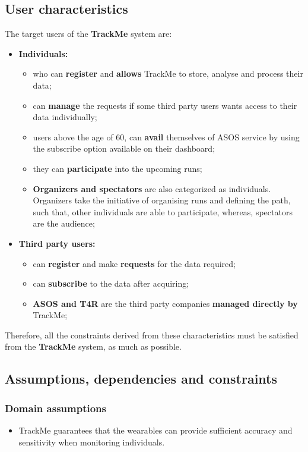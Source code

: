 \documentclass[12pt]{article}
\newcommand\assumption[1]{\item[{[D#1]}] }
\begin{document}
\subsection{User characteristics}
The target users of the \textbf{TrackMe} system are:
\begin{itemize}
\item{} \textbf{Individuals:} 
\begin{itemize}
\item{} who can \textbf{register} and \textbf{allows} TrackMe to store, analyse and process their data;
\item{} can \textbf{manage} the requests if some third party users wants access to their data individually;
\item{} users above the age of 60, can \textbf{avail} themselves of ASOS service by using the subscribe option available on their dashboard;
\item{} they can \textbf{participate} into the upcoming runs;
\item{} \textbf{Organizers and spectators} are also categorized as individuals. Organizers take the initiative of organising runs and defining the path, such that, other individuals are able to participate, whereas, spectators are the audience;

\end{itemize}
\item{} \textbf{Third party users:}
\begin{itemize}
\item{} can \textbf{register} and make \textbf{requests} for the data required;
\item{} can \textbf{subscribe} to the data after acquiring;
\item{} \textbf{ASOS and T4R} are the third party companies \textbf{managed directly by} TrackMe;
\end{itemize}
\end{itemize}

Therefore, all the constraints derived from these characteristics must be satisfied from the \textbf{TrackMe} system, as much as possible.

\subsection{Assumptions, dependencies and constraints}
\subsubsection{Domain assumptions}
\begin{itemize}
      \assumption{1} TrackMe guarantees that the wearables can provide sufficient accuracy and sensitivity when monitoring individuals.
\end{itemize}
\end{document}
